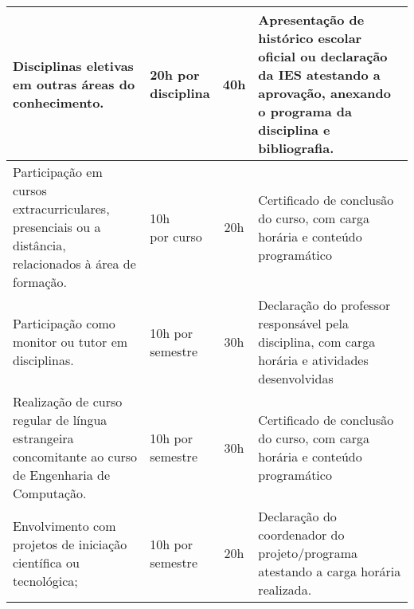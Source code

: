 \begin{small}
\begin{longtable}{m{5.6cm}m{2cm}c m{6.2cm}}
        \bottomrule
        \endlastfoot
        \hline
        Disciplinas eletivas em outras áreas do conhecimento.                                                                       & \parbox[t]{2cm}{\centering 20h por \\disciplina}\vspace{4pt}& 40h &
        Apresentação de histórico escolar oficial ou declaração da IES atestando a aprovação, anexando o programa da disciplina e bibliografia.                          \\
        \hline
        Participação em cursos extracurriculares, presenciais ou a distância, relacionados à área de formação.                      & \parbox[t]{2cm}{\centering 10h     \\por curso}\vspace{4pt}&    20h  & Certificado de conclusão do curso, com carga horária e conteúdo programático            \\
        \hline
        Participação como monitor ou tutor em disciplinas.
                                                                                                                                    &
        \parbox[t]{2cm}{\centering 10h por                                                                                                                               \\semestre}\vspace{4pt}& 30h & Declaração do professor responsável pela disciplina, com carga horária e atividades desenvolvidas                     \\
        \hline
        Realização de curso regular de
        língua estrangeira concomitante
        ao curso de Engenharia de Computação.
                                                                                                                                    & \parbox[t]{2cm}{\centering 10h por \\semestre}\vspace{4pt}& 30h & Certificado de conclusão do curso, com carga horária e conteúdo programático                                          \\
        \hline
        Envolvimento com projetos de iniciação científica ou tecnológica;                                                           & \parbox[t]{2cm}{\centering 10h por \\semestre}\vspace{4pt}& 20h &Declaração do coordenador do
        projeto/programa atestando a
        carga horária realizada.                                                                                                                                         \\

\end{longtable}
\end{small}
